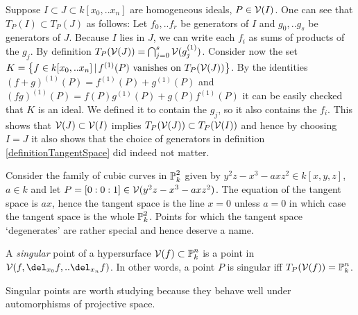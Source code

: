 \begin{example}
Suppose $I \subset J \subset k[x_0,..x_n]$ are homogeneous ideals, $P \in \operatorname{\mathcal V}(I)$.
One can see that $T_P(I) \subset T_P(J)$ as follows: Let $f_0,..f_r$ be generators of $I$ and $g_0,..g_s$ be generators of $J$.
Because $I$ lies in $J$, we can write each $f_i$ as sums of products of the $g_j$.
By definition $T_P(\operatorname{\mathcal V}(J)) = \bigcap_{j=0}^s \operatorname{\mathcal V}(g_j^{(1)})$.
Consider now the set $K = \left\lbrace f \in k[x_0,..x_n] \,|\, f^{(1)}(P) \text{ vanishes on }T_P(\operatorname{\mathcal V}(J))\right\rbrace$.
By the identities $(f+g)^{(1)}(P) = f^{(1)}(P) + g^{(1)}(P)$ and $(fg)^{(1)}(P) = f(P)g^{(1)}(P) + g(P)f^{(1)}(P)$ it can be easily checked that $K$ is an ideal.
We defined it to contain the $g_j$, so it also contains the $f_i$.
This shows that $\operatorname{\mathcal V}(J) \subset \operatorname{\mathcal V}(I)$ implies $T_P(\operatorname{\mathcal V}(J)) \subset T_P(\operatorname{\mathcal V}(I))$ and hence by choosing $I=J$ it also shows that the choice of generators in definition \ref{definitionTangentSpace} did indeed not matter.
\end{example}

\begin{example}
Consider the family of cubic curves in $\operatorname{\mathbb P}^2_k$ given by $y^2z - x^3 - axz^2 \in k[x,y,z]$, $a \in k$ and let $P = [0:0:1] \in \operatorname{\mathcal V}(y^2z - x^3 - axz^2)$.
The equation of the tangent space is $ax$, hence the tangent space is the line $x = 0$ unless $a = 0$ in which case the tangent space is the whole $\operatorname{\mathbb P}^2_k$.
Points for which the tangent space `degenerates' are rather special and hence deserve a name.
\end{example}


\begin{definition}
A \emph{singular} point of a hypersurface $\operatorname{\mathcal V}(f) \subset \operatorname{\mathbb P}^n_k$ is a point in $\V(f,\del_{x_0}f,..\del_{x_n}f)$.
In other words, a point $P$ is singular iff $T_P(\operatorname{\mathcal V}(f)) = \operatorname{\mathbb P}^n_k$.
\end{definition}

Singular points are worth studying because they behave well under automorphisms of projective space.

